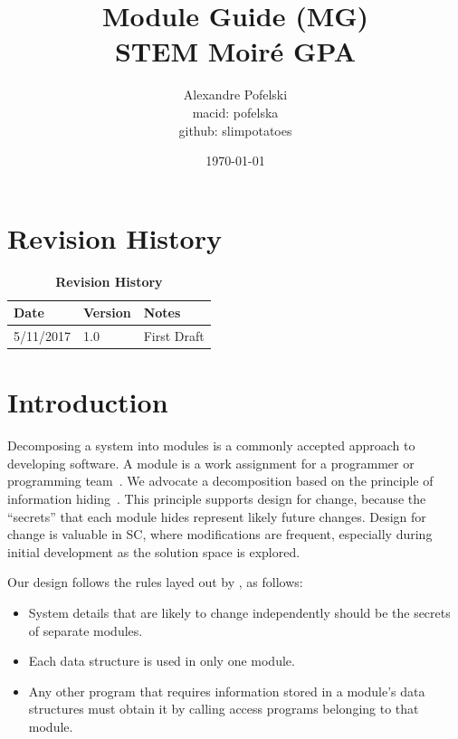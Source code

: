 \documentclass[12pt, titlepage]{article}
\begin{document}
\title{Module Guide (MG) \\
STEM Moir{\'e} GPA} 
\author{Alexandre Pofelski \\
		macid: pofelska \\
		github: slimpotatoes}
\date{\today}

\maketitle


\section{Revision History}

\begin{table}[h]
\caption{\bf Revision History}
\begin{tabularx}{\textwidth}{p{3cm}p{2cm}X}
\toprule {\bf Date} & {\bf Version} & {\bf Notes}\\
\midrule
5/11/2017 & 1.0 & First Draft\\
\bottomrule
\end{tabularx}
\end{table}

\newpage

\tableofcontents

\listoftables

\listoffigures

\newpage


\section{Introduction}

\iffalse
Decomposing a system into modules is a commonly accepted approach to developing
software.  A module is a work assignment for a programmer or programming
team~\cite{ParnasEtAl1984}.  We advocate a decomposition
based on the principle of information hiding~\cite{Parnas1972a}.  This
principle supports design for change, because the ``secrets'' that each module
hides represent likely future changes.  Design for change is valuable in SC,
where modifications are frequent, especially during initial development as the
solution space is explored.  

Our design follows the rules layed out by \cite{ParnasEtAl1984}, as follows:
\begin{itemize}
\item System details that are likely to change independently should be the
  secrets of separate modules.
\item Each data structure is used in only one module.
\item Any other program that requires information stored in a module's data
  structures must obtain it by calling access programs belonging to that module.
\end{itemize}
\end{document}
